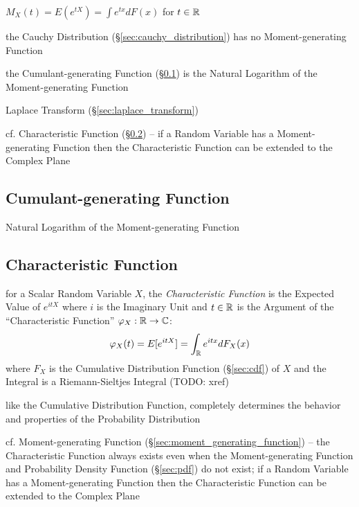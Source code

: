 $M_X(t) = E(e^{tX}) = \int e^{tx} dF(x)$ for $t \in \mathbb{R}$

the Cauchy Distribution (\S\ref{sec:cauchy_distribution}) has no
Moment-generating Function

the Cumulant-generating Function (\S\ref{sec:cumulant_generating_function}) is
the Natural Logarithm of the Moment-generating Function

\fist Laplace Transform (\S\ref{sec:laplace_transform})

cf. Characteristic Function (\S\ref{sec:characteristic_function}) --
if a Random Variable has a Moment-generating Function then the Characteristic
Function can be extended to the Complex Plane



\subsection{Cumulant-generating Function}
\label{sec:cumulant_generating_function}

Natural Logarithm of the Moment-generating Function



\subsection{Characteristic Function}\label{sec:characteristic_function}

for a Scalar Random Variable $X$, the \emph{Characteristic Function} is the
Expected Value of $e^{itX}$ where $i$ is the Imaginary Unit and $t \in \mathbb{R}$
is the Argument of the ``Characteristic Function'' $\varphi_X : \mathbb{R}
\rightarrow \mathbb{C}$:
\[
  \varphi_X(t) = E[e^{itX}] = \int_{\mathbb{R}} e^{itx} dF_X(x)
\]
where $F_X$ is the Cumulative Distribution Function (\S\ref{sec:cdf}) of $X$ and
the Integral is a Riemann-Sieltjes Integral (TODO: xref)

like the Cumulative Distribution Function, completely determines the behavior
and properties of the Probability Distribution

cf. Moment-generating Function (\S\ref{sec:moment_generating_function}) --
the Characteristic Function always exists even when the Moment-generating
Function and Probability Density Function (\S\ref{sec:pdf}) do not exist;
if a Random Variable has a Moment-generating Function then the Characteristic
Function can be extended to the Complex Plane

